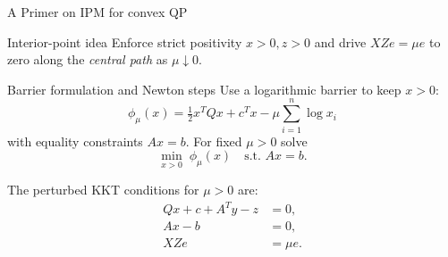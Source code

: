 \begin{frame}{A Primer on IPM for convex QP}
  
{
  \begin{block}{Interior-point idea}
   Enforce strict positivity $x>0, z>0$ and drive $XZe=\mu e$ to zero along the \emph{central path} as $\mu\downarrow0$.
\end{block}
  \begin{block}{Barrier formulation and Newton steps}
  Use a logarithmic barrier to keep $x>0$:
\[
  \phi_\mu(x)=\tfrac{1}{2}x^T Q x + c^T x - \mu \sum_{i=1}^n \log x_i
\]
with equality constraints $Ax=b$. For fixed $\mu>0$ solve
\[\min_{x>0}\; \phi_\mu(x) \quad\text{s.t. } Ax=b.\]
\end{block}
The perturbed KKT conditions for $\mu>0$ are:
\begin{align*}
  Qx + c + A^T y - z &= 0, \\
  Ax - b &= 0, \\
  XZe &= \mu e.
\end{align*}
}

\end{frame}

